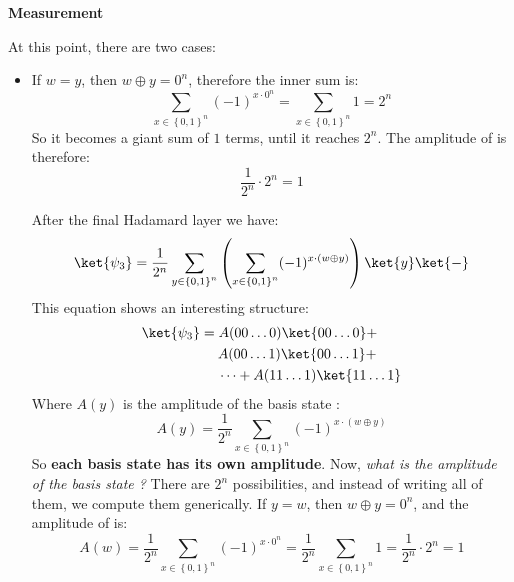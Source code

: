 \begin{flushleft}
    \textcolor{Green3}{ \textbf{Measurement}}
\end{flushleft}
At this point, there are two cases:
\begin{itemize}
    \item If $w = y$, then $w \oplus y = 0^n$, therefore the inner sum is:
    \begin{equation*}
        \sum_{x \in \left\{0,1\right\}^n} (-1)^{x \cdot 0^n} = \sum_{x \in \left\{0,1\right\}^n} 1 = 2^n
    \end{equation*}
    So it becomes a giant sum of $1$ terms, until it reaches $2^n$. The amplitude of  is therefore:
    \begin{equation*}
        \frac{1}{2^n} \cdot 2^n = 1
    \end{equation*}
    \begin{deepeningbox}
        After the final Hadamard layer we have:
        \begin{equation*}
            \ket{\psi_3} = \frac{1}{2^n} \sum_{y \in \left\{0,1\right\}^n} \left( \sum_{x \in \left\{0,1\right\}^n} (-1)^{x \cdot (w \oplus y)} \right) \ket{y} \ket{-}
        \end{equation*}
        This equation shows an interesting structure:
        \begin{align*}
            \ket{\psi_3} &= A (00 \dots 0)\ket{00 \dots 0} + \\
            & \phantom{=} \,\,\, A (00 \dots 1)\ket{00 \dots 1} + \\
            & \phantom{=} \,\,\, \dots + A (11 \dots 1)\ket{11 \dots 1}
        \end{align*}
        Where $A(y)$ is the amplitude of the basis state :
        \begin{equation*}
            A(y) = \frac{1}{2^n} \sum_{x \in \left\{0,1\right\}^n} (-1)^{x \cdot (w \oplus y)}
        \end{equation*}
        So \textbf{each basis state has its own amplitude}. Now, \emph{what is the amplitude of the basis state ?} There are $2^n$ possibilities, and instead of writing all of them, we compute them generically. If $y = w$, then $w \oplus y = 0^n$, and the amplitude of  is:
        \begin{equation*}
            A(w) = \frac{1}{2^n} \sum_{x \in \left\{0,1\right\}^n} (-1)^{x \cdot 0^n} = \frac{1}{2^n} \sum_{x \in \left\{0,1\right\}^n} 1 = \frac{1}{2^n} \cdot 2^n = 1
        \end{equation*}
    \end{deepeningbox}



\end{itemize}
